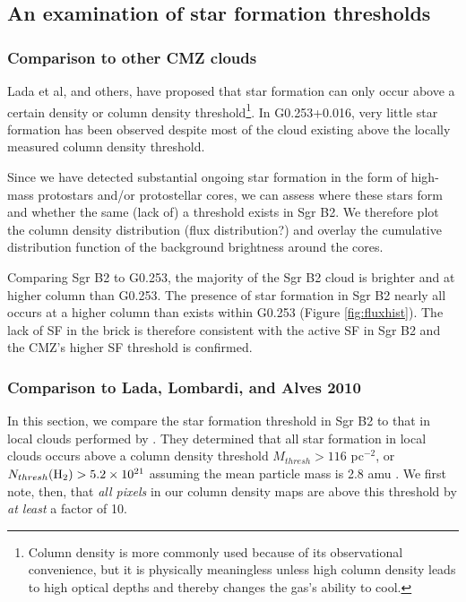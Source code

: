 \documentclass{emulateapj}
\begin{document}
\subsection{An examination of star formation thresholds}
\subsubsection{Comparison to other CMZ clouds}
Lada et al, and others, have proposed that star formation can only occur above
a certain density or column density threshold\footnote{Column density is more
commonly used because of its observational convenience, but it is physically
meaningless unless high column density leads to high optical depths and thereby
changes the gas's ability to cool.}.  In G0.253+0.016, very little star formation
has been observed \citep{Longmore2013a,Johnston2014a,Rathborne2015a} despite
most of the cloud existing above the locally measured column density threshold.

Since we have detected substantial ongoing star formation in the form of
high-mass protostars and/or protostellar cores, we can assess where these stars
form and whether the same (lack of) a threshold exists in Sgr B2.  We therefore
plot the column density distribution (flux distribution?) and overlay the
cumulative distribution function of the background brightness around the cores.

Comparing Sgr B2 to G0.253, the majority of the Sgr B2 cloud is brighter and at
higher column than G0.253.  The presence of star formation in Sgr B2 nearly all
occurs at a higher column than exists within G0.253 (Figure
\ref{fig:fluxhist}).  The lack of SF in the brick is therefore consistent with
the active SF in Sgr B2 and the CMZ's higher SF threshold is confirmed.

\subsubsection{Comparison to Lada, Lombardi, and Alves 2010}
In this section, we compare the star formation threshold in Sgr B2 to that in
local clouds performed by \citet{Lada2010a}.  They determined that all star
formation in local clouds occurs above a column density threshold $M_{thresh} >
116$ \msun pc$^{-2}$, or $N_{thresh}(\textrm{H}_{2}) > 5.2\times10^{21}$ \persc assuming the
mean particle mass is 2.8 amu \citep{Kauffmann2008a}.  We first note, then,
that \emph{all pixels} in our column density maps are above this threshold
by \emph{at least} a factor of 10.
\end{document}
